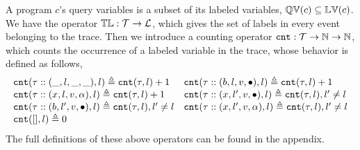 A program $c$'s query variables is a subset of 
its labeled variables, $\mathbb{QV}(c) \subseteq \mathbb{LV}(c)$. We have the operator $\mathbb{TL} : \mathcal{T} \to \mathcal{L}$, which gives the set of labels in every event belonging to the trace.
Then we introduce a counting operator $\mathtt{cnt} : \mathcal{T} \to \mathbb{N} \to \mathbb{N}$, 
which counts the occurrence of a labeled variable in the trace,
whose behavior is defined as follows,
\[
\begin{array}{ll}
\mathtt{cnt}(\mathtt{\tau} :: (\_, l, \_, \_), l ) \triangleq \mathtt{cnt}(\mathtt{\tau}, l) + 1
&
\mathtt{cnt}(\mathtt{\tau}  ::(b, l, v, \bullet), l) \triangleq \mathtt{cnt}(\mathtt{\tau}, l) + 1
\\
\mathtt{cnt}(\mathtt{\tau}  :: (x, l, v, \alpha), l) \triangleq \mathtt{cnt}(\mathtt{\tau}, l) + 1
&
\mathtt{cnt}(\mathtt{\tau}  :: (x, l', v, \bullet), l) \triangleq \mathtt{cnt}(\mathtt{\tau}, l), l' \neq l
\\
\mathtt{cnt}(\mathtt{\tau}  :: (b, l', v, \bullet), l) \triangleq \mathtt{cnt}(\mathtt{\tau}, l), l' \neq l
&
\mathtt{cnt}(\mathtt{\tau}  :: (x, l', v, \alpha), l) \triangleq \mathtt{cnt}(\mathtt{\tau}, l), l' \neq l
\\
\mathtt{cnt}({[]}, l) \triangleq 0
\end{array}
\]
The full definitions of these above operators can be found in the appendix.
